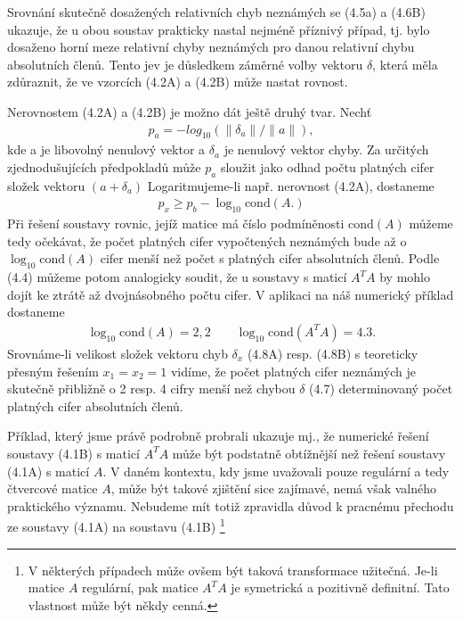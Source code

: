 Srovnání skutečně dosažených relativních chyb neznámých se (4.5a)
a (4.6B) ukazuje, že u obou soustav prakticky nastal nejméně
příznivý případ, tj. bylo dosaženo horní meze relativní chyby
neznámých pro danou relativní chybu absolutních členů. Tento jev je
důsledkem záměrné volby vektoru $\delta$, která měla zdůraznit, že ve
vzorcích (4.2A) a (4.2B) může nastat rovnost.

Nerovnostem (4.2A) a (4.2B) je možno dát ještě druhý tvar.
Nechť
\begin{align*}
\tag{4.9} p_a = -log_{10} (\|\delta_a\| / \|a\|),
\end{align*}
%
kde a je libovolný  nenulový vektor a $\delta_a$ je nenulový
vektor chyby. Za určitých zjednodušujících předpokladů může
$p_a$ sloužit jako odhad počtu platných cifer složek vektoru
$(a  + \delta_a)$
Logaritmujeme-li např. nerovnost (4.2A), dostaneme
%
\begin{align*}
\tag{4.10} p_x \ge p_b - \log_{10} \mathrm{cond}(A.)
\end{align*}
%
Při řešení soustavy rovnic, jejíž matice má číslo podmíněnosti
%
$\mathrm{cond}(A)$
%
můžeme tedy očekávat, že počet platných cifer
vypočtených neznámých bude až o
%
$\log_{10}\mathrm{cond}(A)$
%
cifer menší než počet s platných cifer absolutních členů. Podle (4.4)
můžeme potom analogicky soudit, že u soustavy s maticí $A^TA$ by mohlo
dojít ke ztrátě až dvojnásobného počtu cifer. V aplikaci na náš
numerický příklad dostaneme
%
\begin{align*}
\tag{4.11}   \log_{10}\mathrm{cond}(A) = 2,2  \qquad
             \log_{10}\mathrm{cond}(A^TA) = 4.3.
\end{align*}
%
Srovnáme-li velikost složek vektoru chyb $\delta_x$ (4.8A)
resp. (4.8B) s teoreticky přesným řešením $x_1 = x_2 = 1$ vidíme, že
počet platných cifer neznámých je skutečně přibližně o 2 resp. 4 cifry
menší než chybou $\delta$ (4.7) determinovaný počet platných cifer
absolutních členů.


Příklad, který jsme právě podrobně probrali ukazuje mj., že numerické
řešení soustavy (4.1B) s maticí $A^TA$ může být podstatně obtížnější
než řešení soustavy (4.1A) s maticí $A$.  V daném kontextu, kdy jsme
uvažovali pouze regulární a tedy čtvercové matice $A$, může být takové
zjištění sice zajímavé, nemá však valného praktického
významu. Nebudeme mít totiž zpravidla důvod k pracnému přechodu ze
soustavy (4.1A) na soustavu (4.1B)%
\footnote{
V některých případech může ovšem být taková transformace
užitečná. Je-li matice $A$ regulární, pak matice $A^TA$ je symetrická
a pozitivně definitní. Tato vlastnost může být někdy cenná.
}


